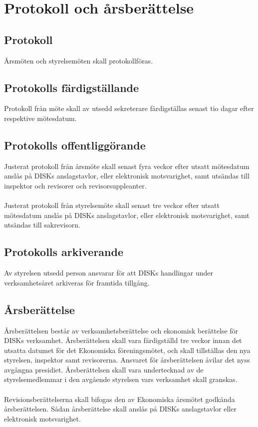 \clearpage
\section{Protokoll och årsberättelse}
\label{sec:protokollocharsberattelse}

	\subsection{Protokoll}
	\label{subsec:protokoll}
		Årsmöten och styrelsemöten skall protokollföras.

	\subsection{Protokolls färdigställande}
	\label{subsec:protokollsfardigstallande}
		Protokoll från möte skall av utsedd sekreterare färdigställas senast tio dagar efter respektive mötesdatum.

	\subsection{Protokolls offentliggörande}
	\label{subsec:protokollsoffentliggorande}
		Justerat protokoll från årsmöte skall senast fyra veckor efter utsatt mötesdatum anslås på DISKs anslagstavlor, eller elektronisk motsvarighet, samt utsändas till inspektor och revisorer och revisorsuppleanter.\\ \\
		Justerat protokoll från styrelsemöte skall senast tre veckor efter utsatt mötesdatum anslås på DISKs anslagstavlor, eller elektronisk motsvarighet, samt utsändas till sakrevisorn.

	\subsection{Protokolls arkiverande}
	\label{subsec:protokollsarkiverande}
		Av styrelsen utsedd person ansvarar för att DISKs handlingar under verksamhetsåret arkiveras för framtida tillgång.

	\subsection{Årsberättelse}
	\label{subsec:arsberattelse}
		Årsberättelsen består av verksamhetsberättelse och ekonomisk berättelse för DISKs verksamhet. Årsberättelsen skall vara färdigställd tre veckor innan det utsatta datumet för det Ekonomiska föreningsmötet, och skall tillställas den nya styrelsen, inspektor samt revisorerna. Ansvaret för årsberättelsen åvilar det nyss avgångna presidiet. Årsberättelsen skall vara undertecknad av de styrelsemedlemmar i den avgående styrelsen vars verksamhet skall granskas.\\ \\
Revisionsberättelserna skall bifogas den av Ekonomiska årsmötet godkända årsberättelsen. Sådan årsberättelse skall anslås på DISKs anslagstavlor eller elektronisk motsvarighet.
